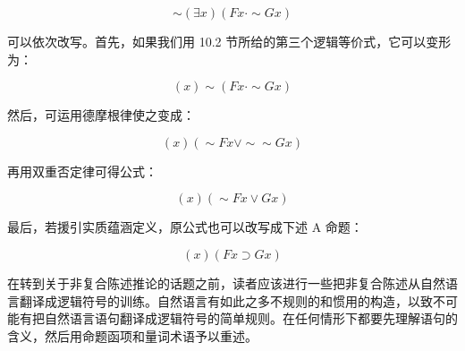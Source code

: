 $$
\sim(\exists x)(F x \cdot \sim G x)
$$

可以依次改写。首先，如果我们用 10.2 节所给的第三个逻辑等价式，它可以变形为：

$$
(x) \sim(F x \cdot \sim G x)
$$

然后，可运用德摩根律使之变成：

$$
(x)(\sim F x \vee \sim \sim G x)
$$

再用双重否定律可得公式：

$$
(x)(\sim F x \vee G x)
$$

最后，若援引实质蕴涵定义，原公式也可以改写成下述 A 命题：

$$
(x)(F x \supset G x)
$$

在转到关于非复合陈述推论的话题之前，读者应该进行一些把非复合陈述从自然语言翻译成逻辑符号的训练。自然语言有如此之多不规则的和惯用的构造，以致不可能有把自然语言语句翻译成逻辑符号的简单规则。在任何情形下都要先理解语句的含义，然后用命题函项和量词术语予以重述。

